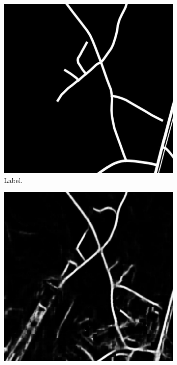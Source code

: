 \begin{figure}[H]
\begin{subfigure}{0.23\textwidth}
\includegraphics[width=\textwidth]{figs/appendix/label1205.jpg}
\caption{ Label. }
\vspace{0.2cm} %
\end{subfigure}
\hspace*{\fill} %
\begin{subfigure}{0.23\textwidth}
\includegraphics[width=\textwidth]{figs/appendix/pred1205.jpg}

\end{subfigure}
\end{figure}
